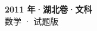 \documentclass[zihao=-4, a4paper]{ctexart}
\begin{document}
\begin{center}
  {\Large\bfseries 2011 年·湖北卷·文科}\\[4pt]
  {\large 数学 · 试题版}
\end{center}
\medskip
{}

\end{document}
